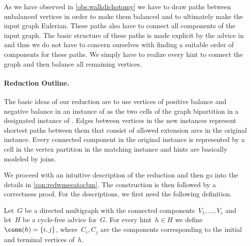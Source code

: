 As we have observed in \autoref{obs:walkdichotomy} we have to draw paths between unbalanced vertices in order to make them balanced and to ultimately make the input graph Eulerian. These paths also have to connect all components of the input graph. The basic structure of these paths is made explicit by the advice in \pWMEECCLAs{} and thus we do not have to concern ourselves with finding a suitable order of components for these paths. We simply have to realize every hint to connect the graph and then balance all remaining vertices.

\paragraph{Reduction Outline.}
The basic ideas of our reduction are to use vertices of positive balance and negative balance in an instance of \pWMEECCLAs{} as the two cells of the graph bipartition in a designated instance of \pCBMs{}. Edges between vertices in the new instances represent shortest paths between them that consist of allowed extension arcs in the original instance. Every connected component in the original instance is represented by a cell in the vertex partition in the matching instance and hints are basically modeled by joins.

We proceed with an intuitive description of the reduction and then go into the details in \autoref{con:redwmeeatocbm}. The construction is then followed by a correctness proof. For the descriptions, we first need the following definition.
\begin{definition}
  Let~$G$ be a directed multigraph with the connected components~$V_1, \ldots, V_c$ and let~$H$ be a cycle-free advice for~$G$. For every hint~$h \in H$ we define~$\conn(h)= \{i, j\}$, where~$C_i, C_j$ are the components corresponding to the initial and terminal vertices of~$h$.
\end{definition}

